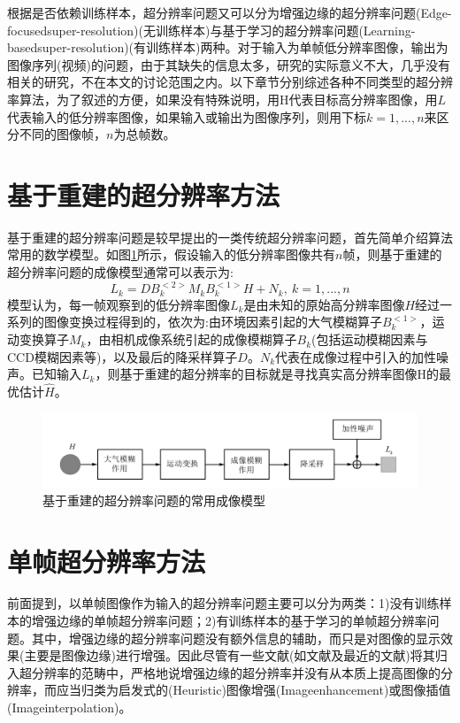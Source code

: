\documentclass[]{article}
\begin{document}
    根据是否依赖训练样本，超分辨率问题又可以分为增强边缘的超分辨率问题(Edge-focusedsuper-resolution)(无训练样本)与基于学习的超分辨率问题(Learning-basedsuper-resolution)(有训练样本)两种。对于输入为单帧低分辨率图像，输出为图像序列(视频)的问题，由于其缺失的信息太多，研究的实际意义不大，几乎没有相关的研究，不在本文的讨论范围之内。以下章节分别综述各种不同类型的超分辨率算法，为了叙述的方便，如果没有特殊说明，用H代表目标高分辨率图像，用$L$代表输入的低分辨率图像，如果输入或输出为图像序列，则用下标$k=1,...,n$来区分不同的图像帧，$n$为总帧数。\\

    \section{基于重建的超分辨率方法}

    基于重建的超分辨率问题是较早提出的一类传统超分辨率问题，首先简单介绍算法常用的数学模型。如图\ref{fig2}所示，假设输入的低分辨率图像共有$n$帧，则基于重建的超分辨率问题的成像模型通常可以表示为:
    \begin{equation}
        L_k=DB^{<2>}_k M_k B^{<1>}_k H+N_k,\ k=1,...,n
    \end{equation}
    模型认为，每一帧观察到的低分辨率图像$L_k$是由未知的原始高分辨率图像$H$经过一系列的图像变换过程得到的，依次为:由环境因素引起的大气模糊算子$B_k^{<1>}$，运动变换算子$M_k$，由相机成像系统引起的成像模糊算子$B_k$(包括运动模糊因素与CCD模糊因素等)，以及最后的降采样算子$D$。$N_k$代表在成像过程中引入的加性噪声。已知输入$L_k$，则基于重建的超分辨率的目标就是寻找真实高分辨率图像H的最优估计$\hat H$。
    \begin{figure}[htbp]
        \centering
        \includegraphics[width=\textwidth]{img/fig-2.png}
        \caption{基于重建的超分辨率问题的常用成像模型}
        \label{fig2}
    \end{figure}

    \section{单帧超分辨率方法}
    前面提到，以单帧图像作为输入的超分辨率问题主要可以分为两类：1)没有训练样本的增强边缘的单帧超分辨率问题；2)有训练样本的基于学习的单帧超分辨率问题。其中，增强边缘的超分辨率问题没有额外信息的辅助，而只是对图像的显示效果(主要是图像边缘)进行增强。因此尽管有一些文献(如文献及最近的文献)将其归入超分辨率的范畴中，严格地说增强边缘的超分辨率并没有从本质上提高图像的分辨率，而应当归类为启发式的(Heuristic)图像增强(Imageenhancement)或图像插值(Imageinterpolation)。\\ 
    
\end{document}
